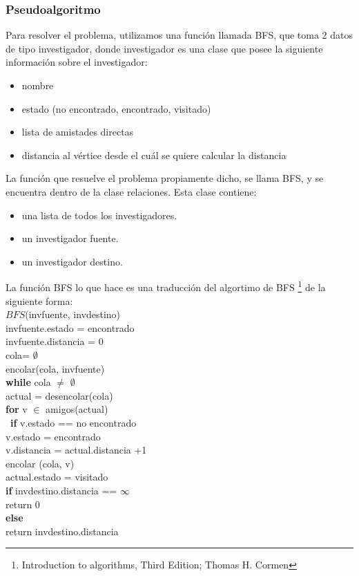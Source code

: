 \subsubsection{Pseudoalgoritmo}
\indent Para resolver el problema, utilizamos una función  llamada BFS, que toma
2 datos de tipo investigador, donde investigador es una clase que posee la
siguiente información sobre el investigador:
\begin{itemize}
	\item nombre
	\item estado (no encontrado, encontrado, visitado)
	\item lista de amistades directas
	\item distancia al vértice desde el cuál se quiere calcular la distancia
\end{itemize}
\indent La función que resuelve el problema propiamente dicho, se llama BFS, y
se encuentra dentro de la clase relaciones. Esta clase contiene:

\begin{itemize}
\item una lista de todos los investigadores.
\item un investigador fuente.
\item un investigador destino.
\end{itemize}
\indent La función BFS lo que hace es una traducción del algortimo de BFS
\footnote{Introduction to algorithms, Third Edition; Thomas H. Cormen}  de la
siguiente forma:\\

$BFS$(invfuente, invdestino)\\
\indent\indent invfuente.estado = encontrado\\
\indent\indent invfuente.distancia = 0\\
\indent\indent cola= $\emptyset$ \\
\indent\indent encolar(cola, invfuente)\\
\indent\indent \textbf{while}  cola $\neq$ $\emptyset$\\
\indent\indent\indent actual = desencolar(cola)\\
\indent\indent\indent \textbf{for}  v $\in$ amigos(actual)\\
\indent\indent\indent\indent\ \textbf{if} v.estado == no encontrado\\
\indent\indent\indent\indent\indent v.estado = encontrado\\
\indent\indent\indent\indent\indent v.distancia = actual.distancia +1\\
\indent\indent\indent\indent\indent encolar (cola, v) \\
\indent\indent\indent actual.estado = visitado\\ 
\indent\indent \textbf{if} invdestino.distancia == $\infty$\\
\indent\indent\indent return 0\\
\indent\indent \textbf{else}\\ 
\indent\indent\indent return invdestino.distancia\\

